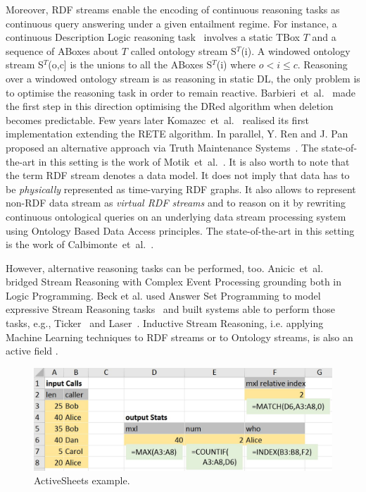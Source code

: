 Moreover, RDF streams enable the encoding of continuous reasoning tasks as continuous query answering under a given entailment regime. For instance, a continuous Description Logic reasoning task~\cite{Walavalkar2008} involves 
a static TBox $T$ and a sequence of ABoxes about $T$ called
ontology stream S$^T$(i).
A windowed ontology stream S$^T$(o,c] is the unions to all the ABoxes
S$^T$(i) where $o<i\leq c$.
Reasoning over a windowed ontology stream is as reasoning in static DL, the only problem is to optimise the reasoning task in order to remain reactive. Barbieri~et~al.~\cite{DBLP:conf/esws/BarbieriBCVG10} made the first step in this direction optimising the DRed algorithm when deletion becomes predictable. Few years later Komazec~et~al.~\cite{DBLP:conf/debs/KomazecCF12} realised its first implementation extending the RETE algorithm. In parallel, Y. Ren and J. Pan proposed an alternative approach via Truth Maintenance Systems~\cite{Ren2011}. The state-of-the-art in this setting is the work of Motik~et~al.~\cite{DBLP:conf/aaai/MotikNPH15a}.  It is also worth to note that the term RDF stream denotes a data model. It does not imply that data has to be \emph{physically} represented as time-varying RDF graphs. It also allows to represent non-RDF data stream as \emph{virtual RDF streams} and to reason on it by rewriting continuous ontological queries on an underlying data stream processing system using Ontology Based Data Access principles. The state-of-the-art in this setting is the work of Calbimonte~et~al.~\cite{DBLP:conf/esws/CalbimonteMC16}.

However, alternative reasoning tasks can be performed, too. Anicic~et~al.~\cite{DBLP:journals/semweb/AnicicRFS12} bridged Stream Reasoning with Complex Event Processing grounding both in Logic Programming. Beck et al. used Answer Set Programming to model expressive Stream Reasoning tasks~\cite{DBLP:conf/aaai/BeckDEF15} and built systems able to perform those tasks, e.g.,  Ticker~\cite{DBLP:journals/tplp/BeckEB17} and Laser~\cite{DBLP:conf/semweb/BazoobandiBU17}. Inductive Stream Reasoning, i.e. applying Machine Learning techniques to RDF streams or to Ontology streams, is also an active field \cite{DBLP:conf/ijcai/ChenLPC17,DBLP:conf/ijcai/LecueP13,DBLP:journals/expert/BarbieriBCVHTRW10} .


\begin{figure}[!h]
\centerline{\includegraphics[width=\columnwidth]{CallStats.jpg}}
\vspace*{-4mm}
\caption{\label{fig:activesheets}ActiveSheets example.}
\end{figure}

